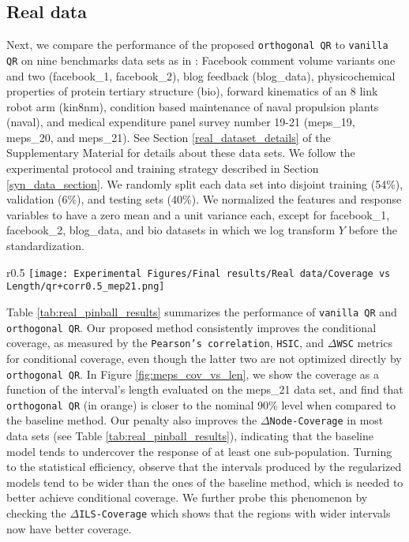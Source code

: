\documentclass{article}
\begin{document}
\subsection{Real data}

Next, we compare the performance of the proposed \texttt{orthogonal QR} to \texttt{vanilla QR} on nine benchmarks data sets as in \cite{CQR,beyond_pinball_loss}: Facebook comment volume variants one and two (facebook\_1, facebook\_2), blog feedback (blog\_data), physicochemical properties of protein tertiary structure (bio), forward kinematics of an 8 link robot arm (kin8nm), condition based maintenance of naval propulsion plants (naval), and medical expenditure panel survey number 19-21 (meps\_19, meps\_20, and meps\_21). See Section \ref{real_dataset_details} of the Supplementary Material for details about these data sets. We follow the experimental protocol and training strategy described in Section \ref{syn_data_section}. We randomly split each data set into disjoint training (54\%), validation (6\%), and testing sets (40\%). We normalized the features and response variables to have a zero mean and a unit variance each, except for facebook\_1, facebook\_2, blog\_data, and bio datasets in which we log transform $Y$ before the standardization.

\begin{wrapfigure}[16]{r}{0.5\textwidth}
  \vspace{-0.4cm}
  \centering
    \texttt{[image: Experimental Figures/Final results/Real data/Coverage vs Length/qr+corr0.5\_mep21.png]}
    \caption{Length versus coverage for \texttt{vanilla QR} and \texttt{orthogonal QR} over the meps\_21 data. In Section~\ref{real_exp_description} of the Supplementary Material we explain how the figure was constructed.}
    \label{fig:meps_cov_vs_len}
\end{wrapfigure}
Table \ref{tab:real_pinball_results} summarizes the performance of \texttt{vanilla QR} and \texttt{orthogonal QR}. Our proposed method consistently improves the conditional coverage, as measured by the \texttt{Pearson's correlation}, \texttt{HSIC}, and $\Delta$\texttt{WSC} metrics for conditional coverage, even though the latter two are not optimized directly by \texttt{orthogonal QR}. In Figure \ref{fig:meps_cov_vs_len}, we show the coverage as a function of the interval's length evaluated on the meps\_21 data set, and find that \texttt{orthogonal QR} (in orange) is closer to the nominal 90\% level when compared to the baseline method. Our penalty also improves the \texttt{$\Delta$Node-Coverage} in most data sets (see Table \ref{tab:real_pinball_results}), indicating that the baseline model tends to undercover the response of at least one sub-population. Turning to the statistical efficiency, observe that the intervals produced by the regularized models tend to be wider than the ones of the baseline method, which is needed to better achieve conditional coverage. We further probe this phenomenon by checking the $\Delta$\texttt{ILS-Coverage} which shows that the regions with wider intervals now have better coverage. 
\end{document}
